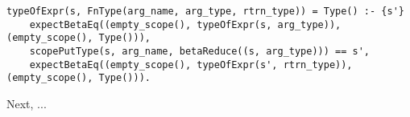 \begin{lstlisting}
typeOfExpr(s, FnType(arg_name, arg_type, rtrn_type)) = Type() :- {s'}
    expectBetaEq((empty_scope(), typeOfExpr(s, arg_type)), (empty_scope(), Type())),
    scopePutType(s, arg_name, betaReduce((s, arg_type))) == s',
	expectBetaEq((empty_scope(), typeOfExpr(s', rtrn_type)), (empty_scope(), Type())).
\end{lstlisting}

Next, ...



